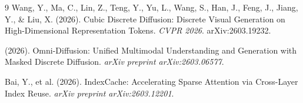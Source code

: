\documentclass[11pt]{article}
\begin{document}
\begin{thebibliography}{9}
 Wang, Y., Ma, C., Lin, Z., Teng, Y., Yu, L., Wang, S., Han, J., Feng, J., Jiang, Y., \& Liu, X. (2026). Cubic Discrete Diffusion: Discrete Visual Generation on High-Dimensional Representation Tokens. \textit{CVPR 2026}. arXiv:2603.19232.

 (2026). Omni-Diffusion: Unified Multimodal Understanding and Generation with Masked Discrete Diffusion. \textit{arXiv preprint arXiv:2603.06577}.

 Bai, Y., et al. (2026). IndexCache: Accelerating Sparse Attention via Cross-Layer Index Reuse. \textit{arXiv preprint arXiv:2603.12201}.
\end{thebibliography}
\end{document}
